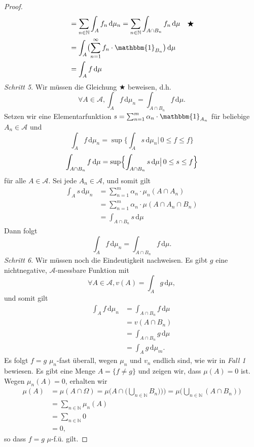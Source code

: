 \documentclass[/Users/zhangwusheng/Documents/satz von radon nikodym/satz von radon nikodym.tex]{subfiles}
\begin{document}
\begin{proof}
\begin{align*}
            &= \sum_{n \in \mathbb{N}} \int_A f_n\,\mathrm{d}\mu_n = \sum_{n \in \mathbb{N}} \int_{A \cap B_n} f_n\,\mathrm{d}\mu \quad \bigstar\\
            &= \int_A \bigl(\sum_{n=1}^\infty f_n \cdot \mathbbm{1}_{B_n}\bigl)\,\mathrm{d}\mu\\
            &= \int_A f\,\mathrm{d}\mu
        \end{align*}
        \textit{Schritt 5}. Wir müssen die Gleichung $\bigstar$ beweisen, d.h. 
        \[\forall A \in \mathcal{A}, \int_A f\,\mathrm{d}\mu_n = \int_{A \cap B_n} f\,\mathrm{d}\mu.\]
        Setzen wir eine Elementarfunktion $s = \sum_{n=1}^m \alpha_n \cdot \mathbbm{1}_{A_n}$ für beliebige $A_n \in \mathcal{A}$ und 
        \[\int_A f\,\mathrm{d}\mu_n = \sup \bigl\{\int_A s\,\mathrm{d}\mu_n \bigl|\, 0 \leq f \leq f\bigr\}\]
        \[\int_{A \cap B_n} f\,\mathrm{d}\mu =\sup \Bigl\{\int_{A \cap B_n} s\,\mathrm{d}\mu\bigl|\, 0 \leq s \leq f\Bigr\}\]
        für alle $A \in \mathcal{A}$. 
        Sei jede $A_n \in \mathcal{A}$, und somit gilt 
        \begin{align*} 
            \int_A s\,\mathrm{d}\mu_n &= \sum_{n=1}^m \alpha_n \cdot \mu_n(A \cap A_n)\\
            &= \sum_{n=1}^m \alpha_n \cdot \mu(A \cap A_n \cap B_n)\\
            &= \int_{A \cap B_n} s\,\mathrm{d}\mu
        \end{align*}
        Dann folgt 
        \[\int_A f\,\mathrm{d}\mu_n = \int_{A \cap B_n} f\,\mathrm{d}\mu.\]
        \textit{Schritt 6}. Wir müssen noch die Eindeutigkeit nachweisen. Es gibt $g$ eine nichtnegative, $\mathcal{A}$-messbare Funktion mit 
        \[\forall A \in \mathcal{A}, v(A) = \int_A g\,\mathrm{d}\mu,\]
        und somit gilt
        \begin{align*}
            \int_A f\,\mathrm{d}\mu_n &= \int_{A \cap B_n} f\,\mathrm{d}\mu\\
            &= v(A \cap B_n)\\
            &= \int_{A \cap B_n} g\,\mathrm{d}\mu\\
            &= \int_A g\,\mathrm{d}\mu_m.
        \end{align*}
        Es folgt $f = g$ $\mu_n$-fast überall, wegen $\mu_n$ und $v_n$ endlich sind, wie wir in \textit{Fall 1} bewiesen. 
        Es gibt eine Menge $A = \{f \neq g\}$ und zeigen wir, dass $\mu(A) = 0$ ist. Wegen $\mu_n(A) =0$, erhalten wir 
        \begin{align*} 
            \mu(A) &= \mu(A \cap \Omega)= \mu \bigl(A \cap \bigl(\bigcup_{n \in \mathbb{N}} B_n\bigr))\bigr)= \mu \bigl(\bigcup_{n \in \mathbb{N}} (A \cap B_n)\bigr)\\
            &= \sum_{n \in \mathbb{N}} \mu_n(A)\\
            &= \sum_{n \in \mathbb{N}} 0\\
                   &=0,        
        \end{align*}
        so dass $f=g$ $\mu$-f.ü. gilt. 
    \end{proof}
\end{document}
